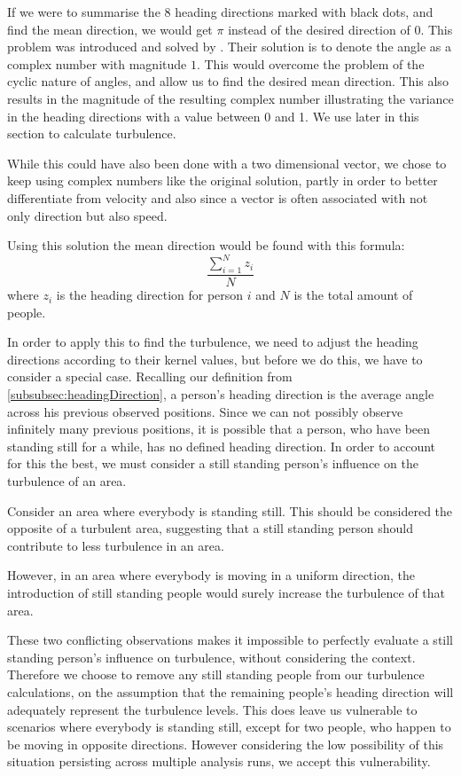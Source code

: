 If we were to summarise the 8 heading directions marked with black dots, and find the mean direction, we would get $\pi$ instead of the desired direction of $0$. This problem was introduced and solved by \citet{localTrendStatistics}. Their solution is to denote the angle as a complex number with magnitude $1$. This would overcome the problem of the cyclic nature of angles, and allow us to find the desired mean direction. This also results in the magnitude of the resulting complex number illustrating the variance in the heading directions with a value between 0 and 1. We use later in this section to calculate turbulence.

While this could have also been done with a two dimensional vector, we chose to keep using complex numbers like the original solution, partly in order to better differentiate from velocity and also since a vector is often associated with not only direction but also speed.

Using this solution the mean direction would be found with this formula: $$\frac{\sum_{i=1}^{N} z_i}{N}$$ where $z_i$ is the heading direction for person $i$ and $N$ is the total amount of people.

In order to apply this to find the turbulence, we need to adjust the heading directions according to their kernel values, but before we do this, we have to consider a special case. Recalling our definition from \cref{subsubsec:headingDirection}, a person's heading direction is the average angle across his previous observed positions. Since we can not possibly observe infinitely many previous positions, it is possible that a person, who have been standing still for a while, has no defined heading direction. In order to account for this the best, we must consider a still standing person's influence on the turbulence of an area.

Consider an area where everybody is standing still. This should be considered the opposite of a turbulent area, suggesting that a still standing person should contribute to less turbulence in an area.

However, in an area where everybody is moving in a uniform direction, the introduction of still standing people would surely increase the turbulence of that area.

These two conflicting observations makes it impossible to perfectly evaluate a still standing person's influence on turbulence, without considering the context. Therefore we choose to remove any still standing people from our turbulence calculations, on the assumption that the remaining people's heading direction will adequately represent the turbulence levels. This does leave us vulnerable to scenarios where everybody is standing still, except for two people, who happen to be moving in opposite  directions. However considering the low possibility of this situation persisting across multiple analysis runs, we accept this vulnerability.

